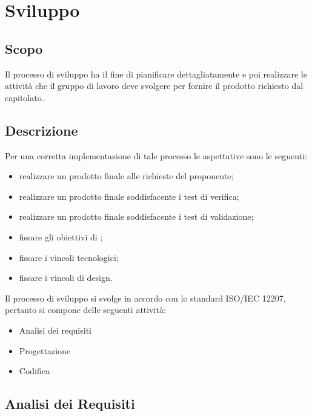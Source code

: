 \documentclass[../NomeDocumento.tex]{subfiles}
\begin{document}
	

\section{Sviluppo}

\subsection{Scopo}

Il processo di sviluppo ha il fine di pianificare dettagliatamente e poi realizzare le attività che il gruppo di lavoro deve svolgere per fornire il prodotto richiesto dal capitolato.

\subsection{Descrizione}

Per una corretta implementazione di tale processo le aspettative sono le seguenti:

\begin{itemize}
	\item realizzare un prodotto finale  alle richieste del proponente;
	\item realizzare un prodotto finale soddisfacente i test di verifica;
	\item realizzare un prodotto finale soddisfacente i test di validazione;
	\item fissare gli obiettivi di ;
	\item fissare i vincoli tecnologici;
	\item fissare i vincoli di design.
\end{itemize}

\noindent Il processo di sviluppo si svolge in accordo con lo standard ISO/IEC 12207, pertanto si compone delle seguenti attività:

\begin{itemize}
	\item Analisi dei requisiti
	\item Progettazione
	\item Codifica
\end{itemize}

\subsection{Analisi dei Requisiti}
\end{document}
